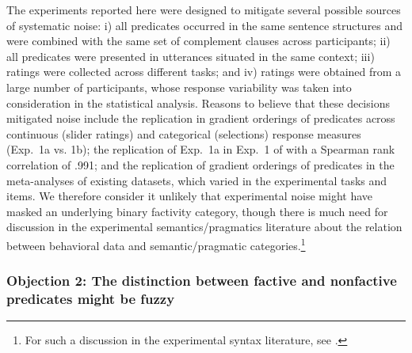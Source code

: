 \documentclass{language}
\newcommand{\6}{\mbox{$[\hspace*{-.6mm}[$}}
\newcommand{\9}{\mbox{$]\hspace*{-.6mm}]$}}
\begin{document}
The experiments reported here were designed to mitigate several possible sources of systematic noise: i) all predicates occurred in the same sentence structures and were combined with the same set of complement clauses across participants; ii) all predicates were presented in utterances situated in the same context; iii) ratings were collected across different tasks; and iv) ratings were obtained from a large number of participants, whose response variability was taken into consideration in the statistical analysis. Reasons to believe that these decisions mitigated noise include the replication in gradient orderings of predicates across continuous (slider ratings) and categorical (selections) response measures (Exp.~1a vs. 1b); the replication of Exp.~1a in Exp.~1 of \citealt{degen-tonhauser-openmind}  with a Spearman rank correlation of .991; and the replication of gradient orderings of predicates in the meta-analyses of existing datasets, which varied in the experimental tasks and items. We therefore consider it unlikely that experimental noise might have masked an underlying binary factivity category, though there is much need for discussion in the experimental semantics/pragmatics literature about the relation between behavioral data and semantic/pragmatic categories.\footnote{For such a discussion in the experimental syntax literature, see \citealt{lau2014, lau2017, sprouse2007, sprouse2013, hofmeister2010, keller2000, sorace2005}.}


\subsubsection{Objection 2: The distinction between factive and nonfactive predicates might be fuzzy}
\end{document}
